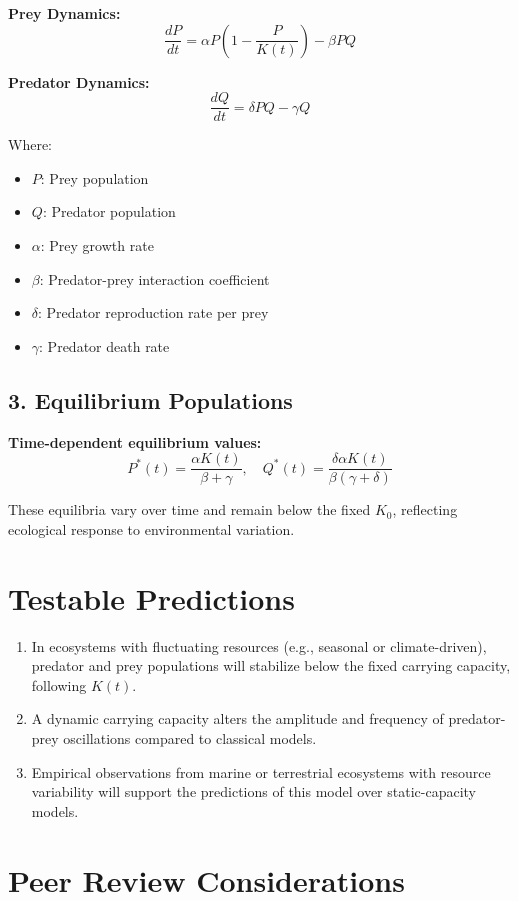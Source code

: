 \documentclass[12pt]{article}
\begin{document}
\textbf{Prey Dynamics:}
\[
\frac{dP}{dt} = \alpha P \left(1 - \frac{P}{K(t)} \right) - \beta P Q
\]

\textbf{Predator Dynamics:}
\[
\frac{dQ}{dt} = \delta P Q - \gamma Q
\]

Where:
\begin{itemize}
  \item \( P \): Prey population
  \item \( Q \): Predator population
  \item \( \alpha \): Prey growth rate
  \item \( \beta \): Predator-prey interaction coefficient
  \item \( \delta \): Predator reproduction rate per prey
  \item \( \gamma \): Predator death rate
\end{itemize}

\subsection*{3. Equilibrium Populations}

\textbf{Time-dependent equilibrium values:}
\[
P^*(t) = \frac{\alpha K(t)}{\beta + \gamma}, \quad
Q^*(t) = \frac{\delta \alpha K(t)}{\beta(\gamma + \delta)}
\]

These equilibria vary over time and remain below the fixed \( K_0 \), reflecting ecological response to environmental variation.

\section*{Testable Predictions}

\begin{enumerate}
  \item In ecosystems with fluctuating resources (e.g., seasonal or climate-driven), predator and prey populations will stabilize below the fixed carrying capacity, following \( K(t) \).
  \item A dynamic carrying capacity alters the amplitude and frequency of predator-prey oscillations compared to classical models.
  \item Empirical observations from marine or terrestrial ecosystems with resource variability will support the predictions of this model over static-capacity models.
\end{enumerate}

\section*{Peer Review Considerations}
\end{document}
